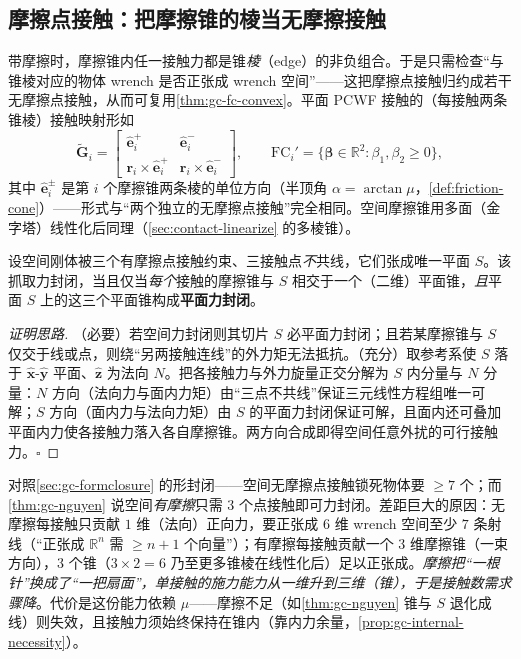 \subsection{摩擦点接触：把摩擦锥的棱当无摩擦接触}
\label{sec:gc-fc-friction}

带摩擦时，摩擦锥内任一接触力都是锥\emph{棱}（edge）的非负组合。于是只需检查“与锥棱对应的物体 wrench 是否正张成 wrench 空间”——这把摩擦点接触归约成若干无摩擦点接触，从而可复用\cref{thm:gc-fc-convex}。平面 PCWF 接触的（每接触两条锥棱）接触映射形如
\begin{equation}
  \tilde{\mathbf{G}}_i=\begin{bmatrix}\hat{\mathbf{e}}_i^{+} & \hat{\mathbf{e}}_i^{-}\\ \mathbf{r}_i\times\hat{\mathbf{e}}_i^{+} & \mathbf{r}_i\times\hat{\mathbf{e}}_i^{-}\end{bmatrix},
  \qquad \mathrm{FC}_i'=\{\boldsymbol{\beta}\in\mathbb{R}^2:\beta_1,\beta_2\ge0\},
  \label{eq:gc-fc-edges}
\end{equation}
其中 $\hat{\mathbf{e}}_i^{\pm}$ 是第 $i$ 个摩擦锥两条棱的单位方向（半顶角 $\alpha=\arctan\mu$，\cref{def:friction-cone}）——形式与“两个独立的无摩擦点接触”完全相同。空间摩擦锥用多面（金字塔）线性化后同理（\cref{sec:contact-linearize} 的多棱锥）。

\begin{theorem}
\label{thm:gc-nguyen}
设空间刚体被三个有摩擦点接触约束、三接触点\emph{不}共线，它们张成唯一平面 $S$。该抓取力封闭，当且仅当\emph{每个}接触的摩擦锥与 $S$ 相交于一个（二维）平面锥，\emph{且}平面 $S$ 上的这三个平面锥构成\textbf{平面力封闭}\cite{nguyen1988,lynch2017modern}。
\end{theorem}
\begin{proof}[证明思路]
（必要）若空间力封闭则其切片 $S$ 必平面力封闭；且若某摩擦锥与 $S$ 仅交于线或点，则绕“另两接触连线”的外力矩无法抵抗。（充分）取参考系使 $S$ 落于 $\hat{\mathbf{x}}\text{-}\hat{\mathbf{y}}$ 平面、$\hat{\mathbf{z}}$ 为法向 $N$。把各接触力与外力旋量正交分解为 $S$ 内分量与 $N$ 分量：$N$ 方向（法向力与面内力矩）由“三点不共线”保证三元线性方程组唯一可解；$S$ 方向（面内力与法向力矩）由 $S$ 的平面力封闭保证可解，且面内还可叠加平面内力使各接触力落入各自摩擦锥。两方向合成即得空间任意外扰的可行接触力。$\square$
\end{proof}

\begin{insight}[摩擦“买”到了什么：从 $\ge7$ 降到 $3$]
对照\cref{sec:gc-formclosure} 的形封闭——空间无摩擦点接触锁死物体要 $\ge7$ 个；而\cref{thm:gc-nguyen} 说空间\emph{有摩擦}只需 $3$ 个点接触即可力封闭。差距巨大的原因：无摩擦每接触只贡献 $1$ 维（法向）正向力，要正张成 $6$ 维 wrench 空间至少 $7$ 条射线（“正张成 $\mathbb{R}^n$ 需 $\ge n+1$ 个向量”）；有摩擦每接触贡献一个 $3$ 维摩擦锥（一束方向），$3$ 个锥（$3\times2=6$ 乃至更多锥棱在线性化后）足以正张成。\emph{摩擦把“一根针”换成了“一把扇面”，单接触的施力能力从一维升到三维（锥），于是接触数需求骤降}。代价是这份能力依赖 $\mu$——摩擦不足（如\cref{thm:gc-nguyen} 锥与 $S$ 退化成线）则失效，且接触力须始终保持在锥内（靠内力余量，\cref{prop:gc-internal-necessity}）。
\end{insight}

